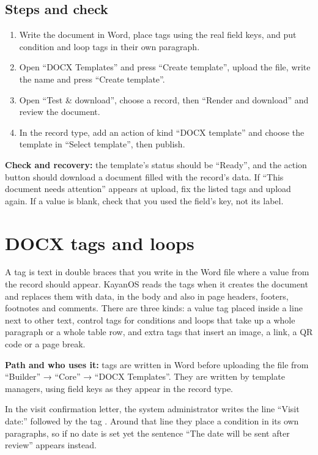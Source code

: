 \subsection{Steps and check}
\begin{enumerate}
\item Write the document in Word, place tags using the real field keys, and put condition and loop tags in their own paragraph.
\item Open “DOCX Templates” and press “Create template”, upload the file, write the name and press “Create template”.
\item Open “Test \& download”, choose a record, then “Render and download” and review the document.
\item In the record type, add an action of kind “DOCX template” and choose the template in “Select template”, then publish.
\end{enumerate}

\textbf{Check and recovery:} the template's status should be “Ready”, and the action button should download a document filled with the record's data. If “This document needs attention” appears at upload, fix the listed tags and upload again. If a value is blank, check that you used the field's key, not its label.

\clearpage
\section{DOCX tags and loops}
\label{sec:builder-feature-docx-tags}

A tag is text in double braces that you write in the Word file where a value from the record should appear. KayanOS reads the tags when it creates the document and replaces them with data, in the body and also in page headers, footers, footnotes and comments. There are three kinds: a value tag placed inside a line next to other text, control tags for conditions and loops that take up a whole paragraph or a whole table row, and extra tags that insert an image, a link, a QR code or a page break.

\textbf{Path and who uses it:} tags are written in Word before uploading the file from “Builder” → “Core” → “DOCX Templates”. They are written by template managers, using field keys as they appear in the record type.

\begin{rcnote}
In the visit confirmation letter, the system administrator writes the line “Visit date:” followed by the tag . Around that line they place a condition in its own paragraphs, so if no date is set yet the sentence “The date will be sent after review” appears instead.
\end{rcnote}


